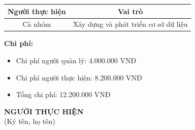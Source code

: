 {\begin{minipage}{\textwidth}
\begin{longtable}{|c|c|}
    \textbf{Người thực hiện} & \textbf{Vai trò} \\
    \hline
    Cả nhóm & Xây dựng và phát triển cơ sở dữ liệu \\
    \hline
    \end{longtable}
    \vspace{0.5cm}
    \noindent \textbf{Chi phí:}
    \begin{itemize}
        \item Chi phí người quản lý: 4.000.000 VNĐ
        \item Chi phí người thực hiện: 8.200.000 VNĐ
        \item Tổng chi phí: 12.200.000 VNĐ
    \end{itemize}
    \vspace{1cm}
    \begin{flushleft}
        \hspace{8cm} \textbf{NGƯỜI THỰC HIỆN} \\
        \hspace{8.8cm} (Ký tên, họ tên) \\
        \vspace{1cm}
    \end{flushleft}
    \end{minipage}
}
% 
